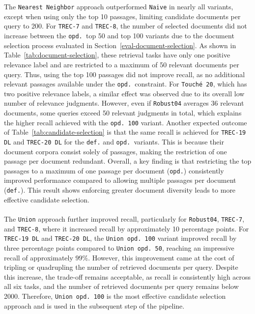 \\\\
The \texttt{Nearest Neighbor} approach outperformed \texttt{Naive} in nearly all variants, except when using only the top 10 passages, limiting candidate documents per query to 200. For \texttt{TREC-7} and \texttt{TREC-8}, the number of selected documents did not increase between the \texttt{opd.\ }top 50 and top 100 variants due to the document selection process evaluated in Section~\ref{eval-document-selection}. As shown in Table~\ref{tab:document-selection}, these retrieval tasks have only one positive relevance label and are restricted to a maximum of 50 relevant documents per query. Thus, using the top 100 passages did not improve recall, as no additional relevant passages available under the \texttt{opd.\ }constraint. For \texttt{Touché 20}, which has two positive relevance labels, a similar effect was observed due to its overall low number of relevance judgments. However, even if \texttt{Robust04} averages 36 relevant documents, some queries exceed 50 relevant judgments in total, which explains the higher recall achieved with the \texttt{opd.\ 100} variant. Another expected outcome of Table~\ref{tab:candidate-selection} is that the same recall is achieved for \texttt{TREC-19 DL} and \texttt{TREC-20 DL} for the \texttt{def.} and \texttt{opd.\ }variants. This is because their document corpora consist solely of passages, making the restriction of one passage per document redundant. Overall, a key finding is that restricting the top passages to a maximum of one passage per document (\texttt{opd.}) consistently improved performance compared to allowing multiple passages per document (\texttt{def.}). This result shows enforcing greater document diversity leads to more effective candidate selection. 
\\\\
The \texttt{Union} approach further improved recall, particularly for \texttt{Robust04}, \texttt{TREC-7}, and \texttt{TREC-8}, where it increased recall by approximately 10 percentage points. For \texttt{TREC-19 DL} and \texttt{TREC-20 DL}, the \texttt{Union opd.\ 100} variant improved recall by three percentage points compared to \texttt{Union opd.\ 50}, reaching an impressive recall of approximately $99\%$. However, this improvement came at the cost of tripling or quadrupling the number of retrieved documents per query. Despite this increase, the trade-off remains acceptable, as recall is consistently high across all six tasks, and the number of retrieved documents per query remains below 2000. Therefore, \texttt{Union opd.\ 100} is the most effective candidate selection approach and is used in the subsequent step of the pipeline.

